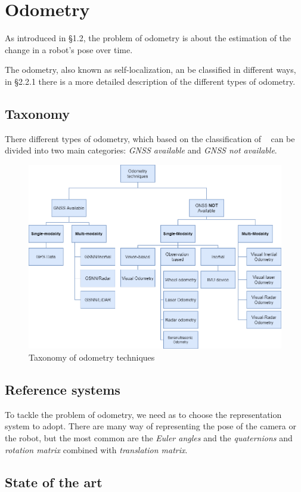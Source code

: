 \section{Odometry}\label{sec:visual-odometry}
As introduced in \S1.2, the problem of odometry is about the estimation of the change in a robot's pose over time.

The odometry, also known as self-localization, an be classified in different ways, in \S2.2.1 there is a more detailed description of the different types of odometry.

\subsection{Taxonomy}\label{subsec:tassonomy}
There different types of odometry, which based on the classification of ~\cite{vo_state_of_art} can be divided into two main categories: \textit{GNSS available} and \textit{GNSS not available}.
\begin{figure}[H]
    \centering
    \includegraphics[width=\textwidth]{images/2_2_taxonomy_odometry}
    \caption{Taxonomy of odometry techniques}\label{fig:odometry-taxonomy}
\end{figure}

\subsection{Reference systems}\label{subsec:reference-systems}
To tackle the problem of odometry, we need as to choose the representation system to adopt.
There are many way of representing the pose of the camera or the robot, but the most common are the \textit{Euler angles} and the \textit{quaternions} and \textit{rotation matrix} combined with \textit{translation matrix}.

\subsection{State of the art}\label{subsec:state-of-the-art}
